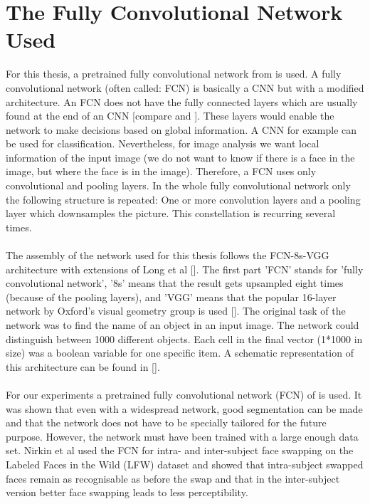 \section{The Fully Convolutional Network Used}
\label{sec:theFCN}
For this thesis, a pretrained fully convolutional network from \cite{nirkin2018_faceswap} is used. A fully convolutional network (often called: FCN) is basically a CNN but with a modified architecture. An FCN does not have the fully connected layers which are usually found at the end of an CNN [compare  and ]. These layers would enable the network to make decisions based on global information. A CNN for example can be used for classification. Nevertheless, for image analysis we want local information of the input image (we do not want to know if there is a face in the image, but where the face is in the image). Therefore, a FCN uses only convolutional and pooling layers. In the whole fully convolutional network only the following structure is repeated: One or more convolution layers and a pooling layer which downsamples the picture. This constellation is recurring several times.\\
\\
The assembly of the network used for this thesis follows the FCN-8s-VGG architecture with extensions of Long et al \cite{jlong} []. The first part 'FCN' stands for 'fully convolutional network', '8s' means that the result gets upsampled eight times (because of the pooling layers), and 'VGG' means that the popular 16-layer network by Oxford's visual geometry group \cite{ksimonyan} is used []. The original task of the network was to find the name of an object in an input image. The network could distinguish between 1000 different objects. Each cell in the final vector (1*1000 in size) was a boolean variable for one specific item. A schematic representation of this architecture can be found in [].\\
\\
For our experiments a pretrained fully convolutional network (FCN) of \cite{nirkin2018_faceswap} is used. It was shown that even with a widespread network, good segmentation can be made and that the network does not have to be specially tailored for the future purpose. However, the network must have been trained with a large enough data set. Nirkin et al used the FCN for intra- and inter-subject face swapping on the Labeled Faces in the Wild (LFW) dataset and showed that intra-subject swapped faces remain as recognisable as before the swap and that in the inter-subject version better face swapping  leads to less perceptibility.\\
